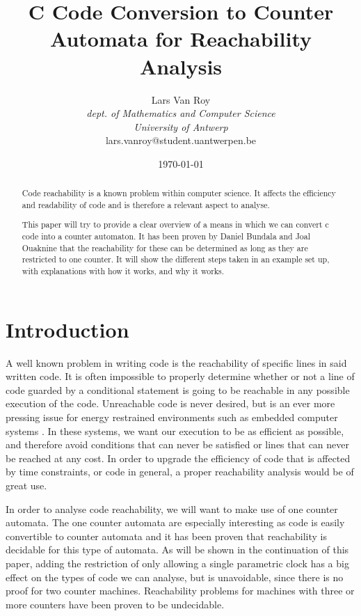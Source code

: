 \documentclass[12pt]{article}
\title{C Code Conversion to Counter Automata for Reachability Analysis}
\author{Lars Van Roy\\
\textit{dept. of Mathematics and Computer Science} \\
\textit{University of Antwerp}\\
lars.vanroy@student.uantwerpen.be}
\date{\today}
\begin{document}
\maketitle{}

\begin{abstract}
\noindent
\noindent
Code reachability is a known problem within computer science. It affects the efficiency and readability of code and is therefore a relevant aspect to analyse.

\noindent
This paper will try to provide a clear overview of a means in which we can convert c code into a counter automaton. It has been proven by Daniel Bundala and Joal Ouaknine that the reachability for these can be determined as long as they are restricted to one counter. It will show the different steps taken in an example set up, with explanations with how it works, and why it works.
\end{abstract}

\section{Introduction}
A well known problem in writing code is the reachability of specific lines in said written code. It is often impossible to properly determine whether or not a line of code guarded by a conditional statement is going to be reachable in any possible execution of the code\cite{713323, 10.1145/1292316.1292319}. Unreachable code is never desired, but is an ever more pressing issue for energy restrained environments such as embedded computer systems \cite{embeddedefficiency}. In these systems, we want our execution to be as efficient as possible, and therefore avoid conditions that can never be satisfied or lines that can never be reached at any cost. In order to upgrade the efficiency of code that is affected by time constraints, or code in general, a proper reachability analysis would be of great use.

In order to analyse code reachability, we will want to make use of one counter automata. The one counter automata are especially interesting as code is easily convertible to counter automata and it has been proven \cite{succintandparametriconecounter, danialandjoel} that reachability is decidable for this type of automata. As will be shown in the continuation of this paper, adding the restriction of only allowing a single parametric clock has a big effect on the types of code we can analyse, but is unavoidable, since there is no proof for two counter machines. Reachability problems for machines with three or more counters have been proven to be undecidable.
\end{document}
